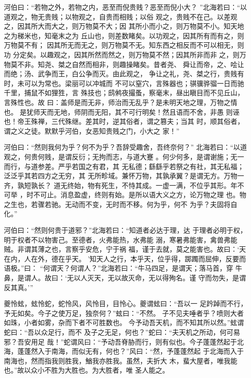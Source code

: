 \documentclass[12pt,UTF8]{ctexbook}
\begin{document}
河伯曰：“若物之外，若物之内，恶至而倪贵贱？恶至而倪小大？ ”北海若曰：“以道观之，物无贵贱；以物观之，自贵而相贱；以俗 观之，贵贱不在己。以差观之，因其所大而大之，则万物莫不大；因 其所小而小之，则万物莫不小。知天地之为稊米也，知毫末之为 丘山也，则差数睹矣。以功观之，因其所有而有之，则万物莫不有； 因其所无而无之，则万物莫不无。知东西之相反而不可以相无，则功 分定矣。以趣观之，因其所然而然之，则万物莫不然；因其所非而非 之，则万物莫不非。知尧、桀之自然而相非，则趣操睹矣。昔者尧、 舜让而帝，之、哙让而绝；汤、武争而王，白公争而灭。由此观之， 争让之礼，尧、桀之行，贵贱有时，未可以为常也。梁丽可以冲城而 不可以窒穴，言殊器也；骐骥骅骝一日而驰千里，捕鼠不如狸狌，言 殊技也；鸱鸺夜撮蚤，察毫末，昼出瞋目而不见丘山，言殊性也。故 曰：盖师是而无非，师治而无乱乎？是未明天地之理，万物之情也。 是犹师天而无地，师阴而无阳，其不可行明矣！然且语而不舍，非愚 则诬也！帝王殊禅，三代殊继。差其时，逆其俗者，谓之篡夫；当其 时，顺其俗者，谓之义之徒。默默乎河伯，女恶知贵贱之门，小大之 家！”

河伯曰：“然则我何为乎？何不为乎？吾辞受趣舍，吾终奈何？” 北海若曰：“以道观之，何贵何贱，是谓反衍；无拘而志，与道大蹇 。何少何多，是谓谢施；无一而行，与道参差。严乎若国之有君，其 无私德；繇繇乎若祭之有社，其无私福；泛泛乎其若四方之无穷，其 无所畛域。兼怀万物，其孰承翼？是谓无方。万物一齐，孰短孰长？ 道无终始，物有死生，不恃其成。一虚一满，不位乎其形。年不可举 ，时不可止。消息盈虚，终则有始。是所以语大义之方，论万物之理 也。物之生也，若骤若驰。无动而不变，无时而不移。何为乎，何不 为乎？夫固将自化。”

河伯曰：“然则何贵于道邪？”北海若曰：“知道者必达于理，达 于理者必明于权，明于权者不以物害己。至德者，火弗能热，水弗能 溺，寒暑弗能害，禽兽弗能贼。非谓其薄之也，言察乎安危，宁于祸 福，谨于去就，莫之能害也。故曰：‘天在内，人在外，德在乎天。 ’知天人之行，本乎天，位乎得，踯躅而屈伸，反要而语极。”曰： “何谓天？何谓人？”北海若曰：“牛马四足，是谓天；落马首，穿 牛鼻，是谓人。故曰：‘无以人灭天，无以故灭命，无以得殉名。谨 守而勿失，是谓反其真。’”

夔怜蚿，蚿怜蛇，蛇怜风，风怜目，目怜心。夔谓蚿曰：“吾以一 足趻踔而不行，予无如矣。今子之使万足，独奈何？”蚿曰：“不然。 子不见夫唾者乎？喷则大者如珠，小者如雾，杂而下者不可胜数也。 今予动吾天机，而不知其所以然。”蚿谓蛇曰：“吾以众足行，而不 及子之无足，何也？”蛇曰：“夫天机之所动，何可易邪？吾安用足 哉！”蛇谓风曰：“予动吾脊胁而行，则有似也。今子蓬蓬然起于北 海，蓬蓬然入于南海，而似无有，何也？”风曰：“然，予蓬蓬然起 于北海而入于南海也，然而指我则胜我，鰌我亦胜我。虽然，夫折大 木，蜚大屋者，唯我能也。”故以众小不胜为大胜也。为大胜者，唯 圣人能之。
\end{document}
